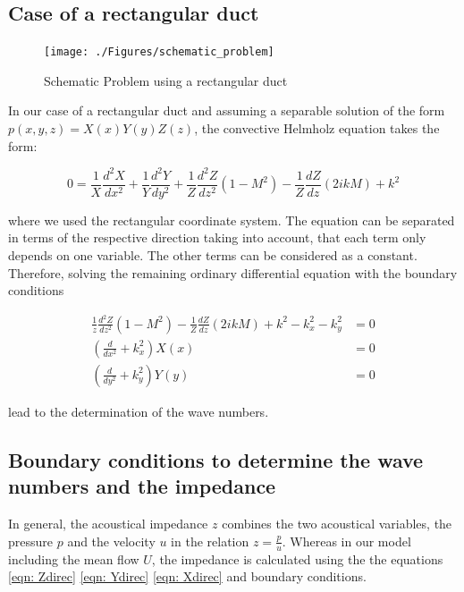 \documentclass[11pt]{report} %
\begin{document}
\subsection{Case of a rectangular duct}
\begin{figure}[H]
\centering
\texttt{[image: ./Figures/schematic\_problem]}
\caption{Schematic Problem using a rectangular duct}
\end{figure}

In our case of a rectangular duct and assuming a separable solution of the form  $p(x,y,z) = X(x)Y(y)Z(z)$, the convective Helmholz equation takes the form: 

\begin{equation}
0=\frac{1}{X} \frac{d^2X}{dx^2}+\frac{1}{Y} \frac{d^2Y}{dy^2}+\frac{1}{Z} \frac{d^2Z}{dz^2}(1-M^2) -\frac{1}{Z}\frac{dZ}{dz}(2ikM)+k^2 	
\end{equation}

where we used the rectangular coordinate system. 
The equation can be separated in terms of the respective direction taking into account, that each term only depends on one variable. 
The other terms can be considered as a constant. 
Therefore,  solving the remaining ordinary differential equation with the boundary conditions

\begin{subequations}
\begin{align}
\frac{1}{z}\frac{d^2Z}{dz^2}(1-M^2)-\frac{1}{Z}\frac{dZ}{dz}(2ikM)+k^2-k_x^2-k_y^2&=0 \label{eqn: Zdirec} \\
\left( \frac{d}{dx^2}+k_x^2\right)X(x)&=0 \label{eqn: Ydirec} \\
\left( \frac{d}{dy^2}+k_y^2\right)Y(y)&=0 \label{eqn: Xdirec}
\end{align}
\end{subequations} 

lead to the determination of the wave numbers.   

\subsection{Boundary conditions to determine the wave numbers and the impedance}
In general, the acoustical impedance $z$ combines the two acoustical variables, the pressure $p$ and the velocity $u$ in the relation $z=\frac{p}{u}$. 
Whereas in our model including the mean flow $U$, the impedance is calculated using the the equations \eqref{eqn: Zdirec} \eqref{eqn: Ydirec} \eqref{eqn: Xdirec} and boundary conditions. 
\end{document}
